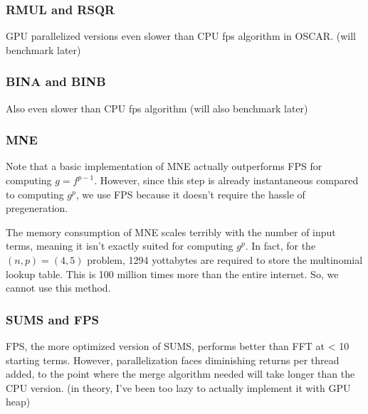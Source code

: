 \subsubsection{RMUL and RSQR}
GPU parallelized versions even slower than CPU fps algorithm in OSCAR. (will benchmark later)

\subsubsection{BINA and BINB}
Also even slower than CPU fps algorithm (will also benchmark later)

\subsubsection{MNE}
Note that a basic implementation of MNE actually outperforms FPS for computing $g = f^{p - 1}$. However, 
since this step is already instantaneous compared to computing $g ^ p$, we use FPS because it doesn't require 
the hassle of pregeneration.

The memory consumption of MNE scales terribly with the number of input terms, meaning it isn't exactly suited for computing $g ^ p$. In fact, for the $(n, p) = (4, 5)$ problem, 1294 yottabytes are required to store the multinomial lookup table. This is 100 million times more than the entire internet. So, we cannot use this method.


\subsubsection{SUMS and FPS}
FPS, the more optimized version of SUMS, performs better than FFT at < 10 starting terms. However,
parallelization faces diminishing returns per thread added, to the point where the merge algorithm needed
will take longer than the CPU version. (in theory, I've been too lazy to actually implement it with GPU 
heap)
